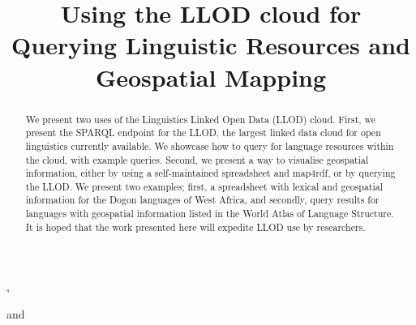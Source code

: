 \documentclass{iosart2c}
\begin{document}
\begin{frontmatter}                           %

\title{Using the LLOD cloud for Querying Linguistic Resources and Geospatial Mapping %
}






\author[A]{ %
},
\author[B,C]{ }
and
\author[D]{ }
\address[A]{Research Unit Quantitative Language Comparison, Ludwig Maximilian University, Geschwister Scholl Platz 1, D-80539 Munich, Germany\\ 
E-mail: bambooforest@gmail.com} %


\address[B]{Department of Intelligent Computer Systems, University of Malta, Msida, MSD2080, Malta}
\address[C]{Computational Linguistics Department, Saarland University, Saarbr\"ucken, 66121, Germany\\  E-mail: littauer@coli.uni-saarland.de}
\address[D]{Intelligent Software Components, iSOCO, S.A., Av. del Partenon 16-18, Madrid, Spain\\
E-mail: bvillazon@isoco.com}

\begin{abstract}
We present two uses of the Linguistics Linked Open Data (LLOD) cloud. First, we present the SPARQL endpoint for the LLOD, the largest linked data cloud for open linguistics currently available. We showcase how to query for language resources within the cloud, with example queries. Second, we present a way to visualise geospatial information, either by using a self-maintained spreadsheet and map4rdf, or by querying the LLOD. We present two examples; first, a spreadsheet with lexical and geospatial information for the Dogon languages of West Africa, and secondly, query results for languages with geospatial information listed in the World Atlas of Language Structure. It is hoped that the work presented here will expedite LLOD use by researchers. %


\end{abstract}
\end{frontmatter}
\end{document}
